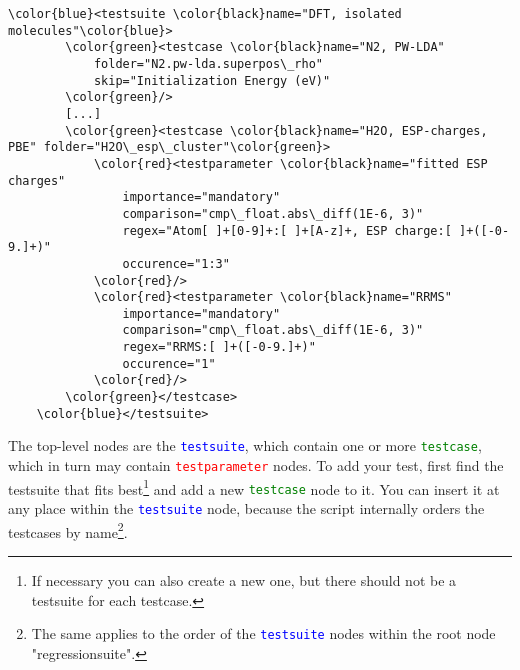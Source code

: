 \documentclass[a4paper,12pt]{scrartcl}
\newcommand{\testsuite}{\textcolor{blue}{\texttt{testsuite}}}
\newcommand{\testcase}{\textcolor{green}{\texttt{testcase}}}
\newcommand{\testparameter}{\textcolor{red}{\texttt{testparameter}}}
\begin{document}
\begin{Verbatim}[commandchars=\\\{\},gobble=4, frame=single, framesep=2mm, label=excerpt from testsuite.xml,
labelposition=bottomline]
    \color{blue}<testsuite \color{black}name="DFT, isolated molecules"\color{blue}>
        \color{green}<testcase \color{black}name="N2, PW-LDA"
            folder="N2.pw-lda.superpos\_rho"
            skip="Initialization Energy (eV)"
        \color{green}/>
        [...]
        \color{green}<testcase \color{black}name="H2O, ESP-charges, PBE" folder="H2O\_esp\_cluster"\color{green}>
            \color{red}<testparameter \color{black}name="fitted ESP charges"
                importance="mandatory"
                comparison="cmp\_float.abs\_diff(1E-6, 3)"
                regex="Atom[ ]+[0-9]+:[ ]+[A-z]+, ESP charge:[ ]+([-0-9.]+)"
                occurence="1:3"
            \color{red}/>
            \color{red}<testparameter \color{black}name="RRMS"
                importance="mandatory"
                comparison="cmp\_float.abs\_diff(1E-6, 3)"
                regex="RRMS:[ ]+([-0-9.]+)"
                occurence="1"
            \color{red}/>
        \color{green}</testcase>
    \color{blue}</testsuite>
\end{Verbatim}
The top-level nodes are the \testsuite{}, which contain one or more \testcase{}, which in turn may contain
\testparameter{} nodes. To add your test, first find the testsuite that fits best\footnote{If necessary you can also
create a new one, but there should not be a testsuite for each testcase.} and add a new \testcase{} node to it. You
can insert it at any place within the \testsuite{} node, because the script internally orders the testcases by
name\footnote{The same applies to the order of the \testsuite{} nodes within the root node "regressionsuite".}.
\end{document}
